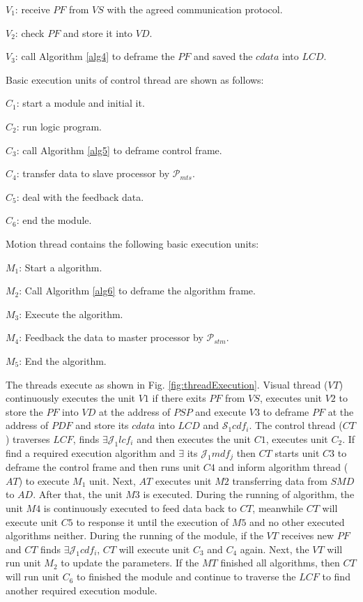 \documentclass[journal,UTF8]{IEEEtran}
\begin{document}
 \textbf{$V_1$}: receive $PF$ from $VS$ with the agreed communication protocol.
 
 \textbf{$V_2$}: check $PF$ and store it into $VD$. 
 
 \textbf{$V_3$}: call Algorithm \ref{alg4} to deframe the $PF$ and saved the $cdata$ into $LCD$.
 
 Basic execution units of control thread are shown as follows:

\textbf{$C_{1}$}: start a module and initial it.

\textbf{$C_{2}$}: run logic program. 

\textbf{$C_{3}$}: call Algorithm \ref{alg5} to deframe control frame.

\textbf{$C_{4}$}: transfer data to slave processor by $\mathcal{P}_{mts}$.

\textbf{$C_{5}$}: deal with the feedback data.

\textbf{$C_{6}$}: end the module.

Motion thread contains the following basic execution units:

\textbf{$M_{1}$}: Start a algorithm.

\textbf{$M_{2}$}: Call Algorithm \ref{alg6} to deframe the algorithm frame.

\textbf{$M_{3}$}: Execute the algorithm.

\textbf{$M_{4}$}: Feedback the data to master processor by $\mathcal{P}_{stm}$.

\textbf{$M_{5}$}: End the algorithm.

The threads execute as shown in Fig. \ref{fig:threadExecution}. Visual thread ($VT$) continuously executes the unit $V1$ if there exits $PF$ from $VS$, executes unit $V2$ to store the $PF$ into $VD$ at the address of $PSP$ and execute $V3$ to deframe $PF$ at the address of $PDF$ and store its $cdata$ into $LCD$ and $\mathcal{S}_1 {cdf_i}$.
The control thread ($CT$) traverses $LCF$, finds $\exists \mathcal{J}_1 {lcf_i}$ and then executes the unit $C1$, executes unit $C_2$. If find a required execution algorithm and $\exists$ its $\mathcal{J}_1 {mdf_j}$ then $CT$ starts unit $C3$ to deframe the control frame and then runs unit $C4$ and inform algorithm thread ($AT$) to execute $M_1$ unit. Next, $AT$ executes unit $M2$ transferring data from $SMD$ to $AD$. After that, the unit $M3$ is executed. During the running of algorithm, the unit $M4$ is continuously executed to feed data back to $CT$, meanwhile $CT$ will execute unit $C5$ to response it until the execution of $M5$ and no other executed algorithms neither. During the running of the module, if the $VT$ receives new $PF$ and $CT$ finds $\exists \mathcal{J}_1 {cdf_i}$, $CT$ will execute unit $C_3$ and $C_4$ again. Next, the $VT$ will run unit $M_2$ to update the parameters. If the $MT$ finished all algorithms, then $CT$ will run unit $C_6$ to finished the module and continue to traverse the $LCF$ to find another required execution module.   
\end{document}
